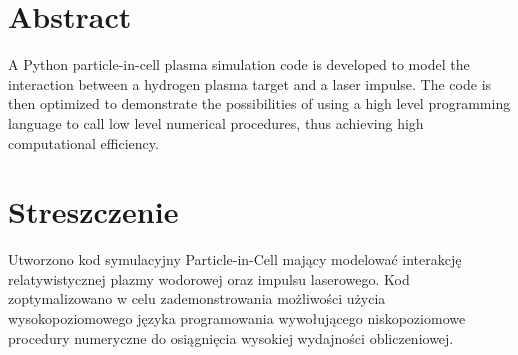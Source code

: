 \section{Abstract} %
A Python particle-in-cell plasma simulation code is developed to model the interaction between a hydrogen plasma target
and a laser impulse. The code is then optimized to demonstrate the possibilities of using a high level programming
language to call low level numerical procedures, thus achieving high computational efficiency.

\section{Streszczenie}
Utworzono kod symulacyjny Particle-in-Cell mający modelować interakcję relatywistycznej plazmy wodorowej oraz
impulsu laserowego. Kod zoptymalizowano w celu zademonstrowania możliwości użycia wysokopoziomowego języka programowania
wywołującego niskopoziomowe procedury numeryczne do osiągnięcia wysokiej wydajności obliczeniowej.

